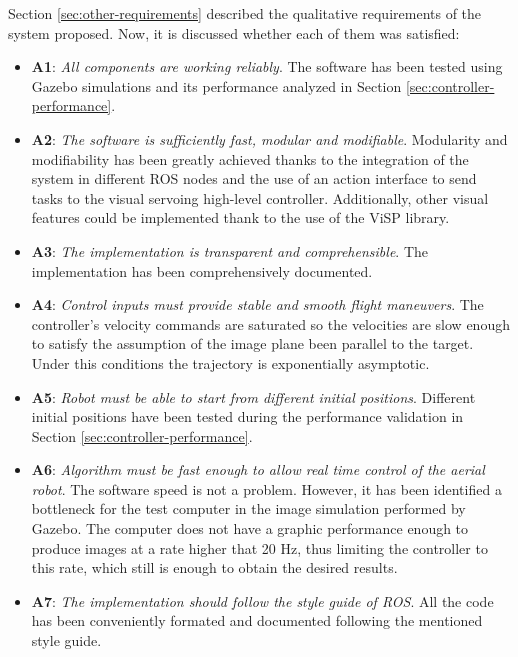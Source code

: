 Section \ref{sec:other-requirements} described the qualitative requirements of the system proposed. Now, it is discussed whether each of them was satisfied:

\begin{itemize}
	\item \textbf{A1}: \emph{All components are working reliably}. The software has been tested using Gazebo simulations and its performance analyzed in Section \ref{sec:controller-performance}.
	
	\item \textbf{A2}: \emph{The software is sufficiently fast, modular and modifiable}. Modularity and modifiability has been greatly achieved thanks to the integration of the system in different ROS nodes and the use of an action interface to send tasks to the visual servoing high-level controller. Additionally, other visual features could be implemented thank to the use of the ViSP library.
	
	\item \textbf{A3}: \emph{The implementation is transparent and comprehensible}. The implementation has been comprehensively documented. 
	
	\item \textbf{A4}: \emph{Control inputs must provide stable and smooth flight maneuvers}. The controller's velocity commands are saturated so the velocities are slow enough to satisfy the assumption of the image plane been parallel to the target. Under this conditions the trajectory is exponentially asymptotic.
	
	\item \textbf{A5}: \emph{Robot must be able to start from different initial positions}. Different initial positions have been tested during the performance validation in Section \ref{sec:controller-performance}.
	
	\item \textbf{A6}: \emph{Algorithm must be fast enough to allow real time control of the aerial robot}. The software speed is not a problem. However, it has been identified a bottleneck for the test computer in the image simulation performed by Gazebo. The computer does not have a graphic performance enough to produce images at a rate higher that 20 Hz, thus limiting the controller to this rate, which still is enough to obtain the desired results.
	
	\item \textbf{A7}: \emph{The implementation should follow the style guide of ROS}. All the code has been conveniently formated and documented following the mentioned style guide.
\end{itemize}